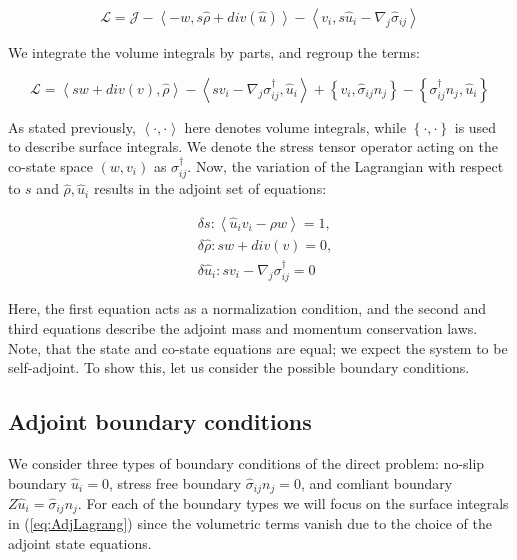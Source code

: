 \begin{equation}
\mathcal{L} = \mathcal{J} - \left< -w, s \hat{\rho} + div(\hat{u}) \right> - \left< v_i, s \hat{u}_i - \nabla_j \hat{\sigma}_{ij} \right>
\end{equation}

We integrate the volume integrals by parts, and regroup the terms:

\begin{equation}
\label{eq:AdjLagrang}
\mathcal{L} = \left< s w + div(v), \hat{\rho} \right> -  \left< s v_i - \nabla_j \sigma_{ij}^\dagger, \hat{u}_i \right> + \left\{ v_i, \hat{\sigma}_{ij}  n_j \right\} - \left\{ \sigma_{ij}^\dagger n_j, \hat{u}_i  \right\}
\end{equation}

As stated previously, $\left<\cdot, \cdot \right>$ here denotes volume integrals, while $\left\{ \cdot, \cdot \right\}$ is used to describe surface integrals. We denote the stress tensor operator acting on the co-state space $(w, v_i)$ as $\sigma_{ij}^\dagger$. Now, the variation of the Lagrangian with respect to $s$ and $\hat{\rho}, \hat{u}_i$ results in the adjoint set of equations:

\begin{subequations}
\label{eq:AdjAcoustProblem}
\begin{flalign}
    \label{eq:AdjAcoustNormCond}
    &\delta s: \left< \hat{u}_i v_i - \rho w \right> = 1,\\&
    \delta \hat{\rho}: s w + div(v) = 0,\\ &
    \delta \hat{u}_i: s v_i -\nabla_j \sigma_{ij}^\dagger = 0
\end{flalign}
\end{subequations}

Here, the first equation acts as a normalization condition, and the second and third equations describe the adjoint mass and momentum conservation laws. Note, that the state and co-state equations are equal; we expect the system to be self-adjoint. To show this, let us consider the possible boundary conditions.

\subsection{Adjoint boundary conditions}

We consider three types of boundary conditions of the direct problem: no-slip boundary $\hat{u}_i = 0$, stress free boundary $\hat{\sigma}_{ij} n_j = 0$, and comliant boundary $Z \hat{u}_i = \hat{\sigma}_{ij} n_j$. For each of the boundary types we will focus on the surface integrals in (\ref{eq:AdjLagrang}) since the volumetric terms vanish due to the choice of the adjoint state equations.

